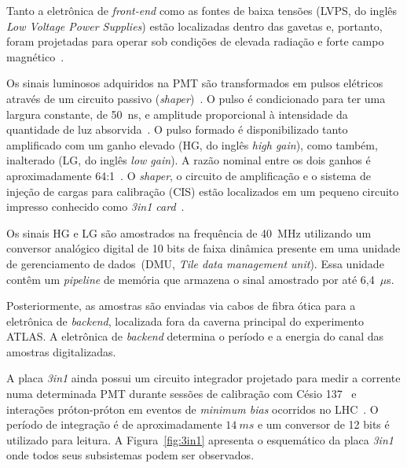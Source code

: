 Tanto a eletrônica de \emph{front-end} como as fontes de baixa tensões (LVPS, do
inglês \emph{Low Voltage Power Supplies}) estão localizadas dentro das gavetas e,
portanto, foram projetadas para operar sob condições de elevada radiação e forte
campo magnético~\cite{hruska2007radiation,ARABIDZE2011}.

Os sinais luminosos adquiridos na PMT são transformados em  pulsos elétricos
através de um circuito passivo (\emph{shaper})~\cite{AMES1998}. O pulso é
condicionado para ter uma largura constante, de 50~ns, e amplitude proporcional
à intensidade da quantidade de luz absorvida~\cite{ANDERSON2005}. O pulso
formado é disponibilizado tanto amplificado com um  ganho elevado (HG, do
inglês \emph{high gain}), como também, inalterado (LG, do inglês \emph{low
gain}). A razão nominal entre os dois ganhos é aproximadamente
64:1~\cite{AAD2010READINESS}. O \emph{shaper}, o circuito de amplificação e o
sistema de injeção de cargas para calibração (CIS) estão localizados em um
pequeno circuito impresso conhecido como \emph{3in1 card}~\cite{ANDERSON2005}.

Os sinais HG e LG são amostrados na frequência de 40~MHz utilizando um conversor
analógico digital de 10 bits de faixa dinâmica presente em uma unidade de
gerenciamento de dados~(DMU, \emph{Tile data management unit}). Essa unidade
contêm um \emph{pipeline} de memória que armazena o sinal amostrado por até
6,4~$\mu$s. 

Posteriormente, as amostras são enviadas via cabos de fibra ótica para a
eletrônica de \emph{backend}, localizada fora da caverna principal do
experimento ATLAS. A eletrônica de \emph{backend} determina o período e a
energia do canal das amostras digitalizadas.

A placa \emph{3in1} ainda possui um circuito integrador projetado para medir a
corrente numa determinada PMT durante sessões de calibração com Césio
137~\cite{ANDERSON2009} e interações próton-próton em eventos de \emph{minimum
bias} ocorridos no LHC~\cite{AAD2010READINESS}. O período de integração é de
aproximadamente $14~ms$ e um conversor de 12 bits é utilizado para leitura. A
Figura~\ref{fig:3in1} apresenta o esquemático da placa \emph{3in1} onde todos
seus subsistemas podem ser observados.

